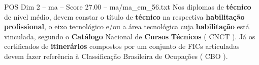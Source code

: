 \begin{textsample}{POS Dim 2 – ma – Score 27.00 – ma/ma\_em\_56.txt}
Nos diplomas de \textbf{técnico} de nível médio, devem constar o título de \textbf{técnico} na respectiva \textbf{habilitação} \textbf{profissional}, o eixo tecnológico e/ou a área tecnológica cuja \textbf{habilitação} está vinculada, segundo o \textbf{Catálogo} Nacional de \textbf{Cursos} \textbf{Técnicos} ( CNCT ).
Já os certificados de \textbf{itinerários} compostos por um conjunto de FICs articuladas devem fazer referência à Classificação Brasileira de Ocupações ( CBO ).

\end{textsample}
